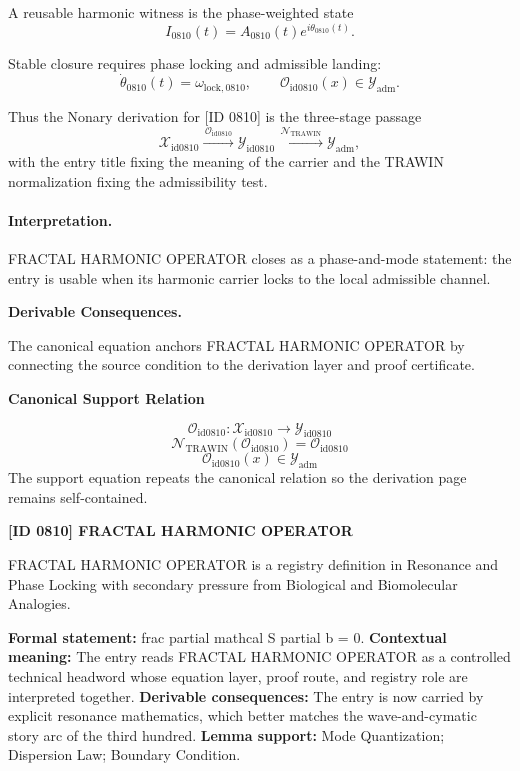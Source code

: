 A reusable harmonic witness is the phase-weighted state\[
I_{0810}(t)=A_{0810}(t)e^{i\theta_{0810}(t)}.
\]

Stable closure requires phase locking and admissible landing:\[
\dot{\theta}_{0810}(t)=\omega_{\mathrm{lock},0810},\qquad \mathcal{O}_{\mathrm{id0810}}(x)\in\mathcal{Y}_{\mathrm{adm}}.
\]

Thus the Nonary derivation for [ID 0810] is the three-stage passage
\[
\mathcal{X}_{\mathrm{id0810}}\xrightarrow{\,\mathcal{O}_{\mathrm{id0810}}\,} \mathcal{Y}_{\mathrm{id0810}}\xrightarrow{\,\mathcal{N}_{\mathrm{TRAWIN}}\,} \mathcal{Y}_{\mathrm{adm}},
\]
with the entry title fixing the meaning of the carrier and the TRAWIN normalization fixing the admissibility test.

\paragraph{Interpretation.} FRACTAL HARMONIC OPERATOR closes as a phase-and-mode statement: the entry is usable when its harmonic carrier locks to the local admissible channel.

\par\vspace{0.35em}
\noindent\textbf{Derivable Consequences.}\quad
\begingroup
\footnotesize
\raggedright
The canonical equation anchors FRACTAL HARMONIC OPERATOR by connecting the source condition to the derivation layer and proof certificate.
\par\endgroup

\noindent\textbf{Canonical Support Relation}\par
\[
\mathcal{O}_{\mathrm{id0810}}:\mathcal{X}_{\mathrm{id0810}}\longrightarrow\mathcal{Y}_{\mathrm{id0810}}
\]
\[
\mathcal{N}_{\mathrm{TRAWIN}}(\mathcal{O}_{\mathrm{id0810}})=\mathcal{O}_{\mathrm{id0810}}
\]
\[
\mathcal{O}_{\mathrm{id0810}}(x)\in\mathcal{Y}_{\mathrm{adm}}
\]
\noindent The support equation repeats the canonical relation so the derivation page remains self-contained.\par

\clearpage
\noindent\textbf{[ID 0810] FRACTAL HARMONIC OPERATOR}\par
\vspace{0.35em}
\begingroup\small
{}
FRACTAL HARMONIC OPERATOR is a registry definition in Resonance and Phase Locking with secondary pressure from Biological and Biomolecular Analogies.

\begingroup\footnotesize\setlength{\emergencystretch}{3em}\sloppy
\textbf{Formal statement:} frac partial mathcal S partial b = 0. \textbf{Contextual meaning:} The entry reads FRACTAL HARMONIC OPERATOR as a controlled technical headword whose equation layer, proof route, and registry role are interpreted together. \textbf{Derivable consequences:} The entry is now carried by explicit resonance mathematics, which better matches the wave-and-cymatic story arc of the third hundred. \textbf{Lemma support:} Mode Quantization; Dispersion Law; Boundary Condition.\par
\endgroup

